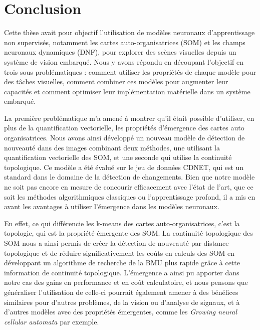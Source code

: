 \chapter*{Conclusion}

Cette thèse avait pour objectif l'utilisation de modèles neuronaux d'apprentissage non supervisés, notamment les cartes auto-organisatrices (SOM) et les champs neuronaux dynamiques (DNF), pour explorer des scènes visuelles depuis un système de vision embarqué. Nous y avons répondu en découpant l'objectif en trois sous problématiques : comment utiliser les propriétés de chaque modèle pour des tâches visuelles, comment combiner ces modèles pour augmenter leur capacités et comment optimiser leur implémentation matérielle dans un système embarqué.

La première problématique m'a amené à montrer qu'il était possible d'utiliser, en plus de la quantification vectorielle, les propriétés d'émergence des cartes auto organisatrices. Nous avons ainsi développé un nouveau modèle de détection de nouveauté dans des images combinant deux méthodes, une utilisant la quantification vectorielle des SOM, et une seconde qui utilise la continuité topologique. Ce modèle a été évalué sur le jeu de données CDNET, qui est un standard dans le domaine de la détection de changements. Bien que notre modèle ne soit pas encore en mesure de concourir efficacement avec l'état de l'art, que ce soit les méthodes algorithmiques classiques ou l'apprentissage profond, il a mis en avant les avantages à utiliser l'émergence dans les modèles neuronaux.

En effet, ce qui différencie les k-means des cartes auto-organisatrices, c'est la topologie, qui est la propriété émergente des SOM. La continuité topologique des SOM nous a ainsi permis de créer la détection de nouveauté par distance topologique et de réduire significativement les coûts en calculs des SOM en développant un algorithme de recherche de la BMU plus rapide grâce à cette information de continuité topologique. L'émergence a ainsi pu apporter dans notre cas des gains en performance et en coût calculatoire, et nous pensons que généraliser l'utilisation de celle-ci pourrait également amener à des bénéfices similaires pour d'autres problèmes, de la vision ou d'analyse de signaux, et à d'autres modèles avec des propriétés émergentes, comme les \textit{Growing neural cellular automata} \cite{mordvintsev2020growing} par exemple.

